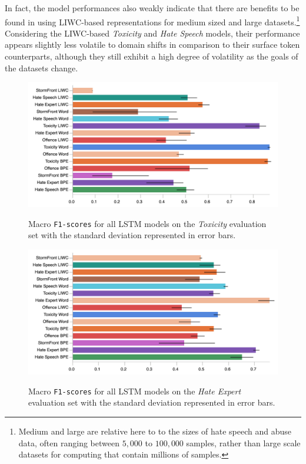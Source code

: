 In fact, the model performances also weakly indicate that there are benefits to be found in using LIWC-based representations for medium sized and large datasets.\footnote{Medium and large are relative here to to the sizes of hate speech and abuse data, often ranging between $5,000$ to $100,000$ samples, rather than large scale datasets for computing that contain millions of samples.}
Considering the LIWC-based \textit{Toxicity} and \textit{Hate Speech} models, their performance appears slightly less volatile to domain shifts in comparison to their surface token counterparts, although they still exhibit a high degree of volatility as the goals of the datasets change.

\begin{figure}
\begin{minipage}{\textwidth}
    \centering
    \includegraphics[width=\textwidth]{all_LSTM_wulczyn_test.pdf}
    \caption{Macro \texttt{F1-scores} for all LSTM models on the \textit{Toxicity} evaluation set with the standard deviation represented in error bars.}
    \label{fig:wulczyn_LSTM_test}
  \vfill
    \includegraphics[width=\textwidth]{all_LSTM_waseem_test.pdf}
    \caption{Macro \texttt{F1-scores} for all LSTM models on the \textit{Hate Expert} evaluation set with the standard deviation represented in error bars.}
    \label{fig:waseem_LSTM_test}
\end{minipage}
\end{figure}

